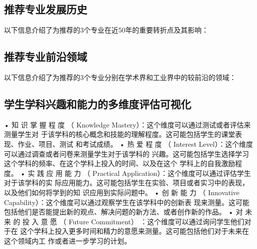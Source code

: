 \documentclass[12pt]{article}
\newcommand{\insertname}{
}
\begin{document}
\begin{CJK*}{UTF8}{gbsn}
\newpage
\subsection*{推荐专业发展历史}
以下信息介绍了为推荐的3个专业在近50年的重要转折点及其影响：

\newpage
\subsection*{推荐专业前沿领域}
以下信息介绍了为推荐的3个专业分别在学术界和工业界中的较前沿的领域：

\newpage
\subsection*{学生学科兴趣和能力的多维度评估可视化}
• 知 识 掌 握 程 度 （ Knowledge Mastery）：这个维度可以通过测试或者评估来测量学生对
于该学科的核心概念和技能的理解程度。这可能包括学生的课堂表现、作业、项目、测试
和考试成绩。
• 热 爱 程 度 （ Interest Level）：这个维度可以通过调查或者问卷来测量学生对于该学科的
兴趣。这可能包括学生选择学习这个学科的频率、在这个学科上投入的时间、以及在这个
学科上的自我激励程度。
• 实 践 应 用 能 力 （ Practical Application）：这个维度可以通过评估学生对于该学科的实
际应用能力。这可能包括学生在实验、项目或者实习中的表现，以及他们如何将学到的知
识应用到实际问题中。
• 创 新 能 力 （ Innovative Capability）：这个维度可以通过观察学生在该学科中的创新表
现来测量。这可能包括他们是否能提出新的观点、解决问题的新方法、或者创作新的作品。
• 对 未 来 的 投 入 意 愿 （ Future Commitment） ：这个维度可以通过询问学生他们对于在
这个学科上投入更多时间和精力的意愿来测量。这可能包括他们对于未来在这个领域内工
作或者进一步学习的计划。








\end{CJK*}
\end{document}
